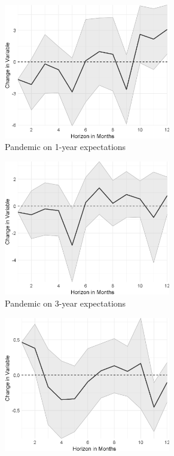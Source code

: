 \newpage
\begin{figure}
	\centering
	\captionsetup{font=footnotesize}
	\begin{subfigure}{00.24\textwidth}
		\includegraphics[width=0.8\textwidth]{output/lp/baseline/bHP/pandemic/pandemiconexpectations1y_djn.eps}
		\caption{Pandemic on 1-year expectations}
	\end{subfigure}
	\begin{subfigure}{00.24\textwidth}
		\includegraphics[width=0.8\textwidth]{output/lp/baseline/bHP/pandemic/pandemiconexpectations3y_djn.eps}
		\caption{Pandemic on 3-year expectations}
	\end{subfigure}
	\begin{subfigure}{00.24\textwidth}
		\includegraphics[width=0.8\textwidth]{output/lp/baseline/bHP/pandemic/pandemiconinflation_djn.eps}

\end{subfigure}
\end{figure}
